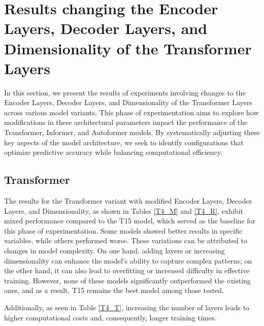 \section{Results changing the Encoder Layers, Decoder Layers, and Dimensionality of the Transformer Layers}

In this section, we present the results of experiments involving changes to the Encoder Layers, Decoder Layers, and Dimensionality of the Transformer Layers across various model variants. This phase of experimentation aims to explore how modifications in these architectural parameters impact the performance of the Transformer, Informer, and Autoformer models. By systematically adjusting these key aspects of the model architecture, we seek to identify configurations that optimize predictive accuracy while balancing computational efficiency.

\subsection{Transformer}
The results for the Transformer variant with modified Encoder Layers, Decoder Layers, and Dimensionality, as shown in Tables \ref{T4_M} and \ref{T4_R}, exhibit mixed performance compared to the T15 model, which served as the baseline for this phase of experimentation. Some models showed better results in specific variables, while others performed worse. These variations can be attributed to changes in model complexity. On one hand, adding layers or increasing dimensionality can enhance the model's ability to capture complex patterns; on the other hand, it can also lead to overfitting or increased difficulty in effective training. However, none of these models significantly outperformed the existing ones, and as a result, T15 remains the best model among those tested.

Additionally, as seen in Table \ref{T4_T}, increasing the number of layers leads to higher computational costs and, consequently, longer training times.


